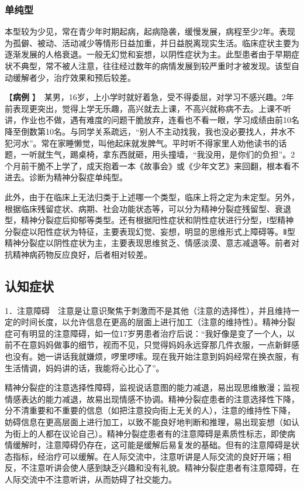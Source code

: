 \subsubsection{单纯型}

本型较为少见，常在青少年时期起病，起病隐袭，缓慢发展，病程至少2年。表现为孤僻、被动、活动减少等情形日益加重，并日益脱离现实生活。临床症状主要为逐渐发展的人格衰退。一般无幻觉和妄想，以阴性症状为主。此型患者由于早期症状不典型，常不被人注意，往往经过数年的病情发展到较严重时才被发现。该型自动缓解者少，治疗效果和预后较差。

【\textbf{病例}
】　{某男，16岁，上小学时就好着急，受不得委屈，对学习不感兴趣。2年前表现更突出，觉得上学无乐趣，高兴就去上课，不高兴就称病不去。上课不听讲，作业也不做，遇有难度的问题干脆放弃，连看也不看一眼，学习成绩由前10名降至倒数第10名。与同学关系疏远，“别人不主动找我，我也没必要找人，井水不犯河水”。常在家睡懒觉，叫他起床就发脾气。平时听不得家里人劝他读书的话题，一听就生气，踢桌椅，拿东西就砸，用头撞墙，“我没用，是你们的负担”。2个月前干脆不上学了，成天抱着一本《故事会》或《少年文艺》来回翻，根本看不进去。诊断为精神分裂症单纯型。}

此外，由于在临床上无法归类于上述哪一个类型，临床上将之定为未定型。另外，根据临床残留症状、病期、社会功能状态等，可以分为精神分裂症残留型、衰退型，精神分裂症后抑郁等类型。还有根据阳性症状和阴性症状进行分型，Ⅰ型精神分裂症以阳性症状为特征，主要表现幻觉、妄想，明显的思维形式上障碍等。Ⅱ型精神分裂症以阴性症状为主，主要表现思维贫乏、情感淡漠、意志减退等。前者对抗精神病药物反应良好，后者相对较差。

\subsection{认知症状}

1．注意障碍　注意是让意识聚焦于刺激而不是其他（注意的选择性），并且维持一定的时间长度，以允许信息在更高的层面上进行加工（注意的维持性）。精神分裂症可有明显的注意障碍，如一位17岁男患者治疗后说：“我好像是变了一个人，以前不在意妈妈做事的细节，视而不见，只觉得妈妈永远穿那几件衣服，一点新鲜感也没有。她一讲话我就嫌烦，啰里啰嗦。现在我开始注意到妈妈经常在换衣服，有生活情调，妈妈讲的话，我能将心比心了”。

精神分裂症的注意选择性障碍，监视说话意图的能力减退，易出现思维散漫；监视情感表达的能力减退，故易出现情感不协调。精神分裂症患者的注意选择性下降，分不清重要和不重要的信息（如把注意投向街上无关的人），注意的维持性下降，妨碍信息在更高层面上进行加工，以致不能良好地判断和推理，易出现妄想（如认为街上的人都在议论自己）。精神分裂症患者有的注意障碍是素质性标志，即使病情缓解时，注意障碍仍存在，这可能是缓解后易复发的基础。但有的注意障碍是状态指标，经治疗可以缓解。在人际交流中，注意听讲是人际交流的良好开端；相反，不注意听讲会使人感到缺乏兴趣和没有礼貌。精神分裂症患者有注意障碍，在人际交流中不注意听讲，从而妨碍了社交能力。

